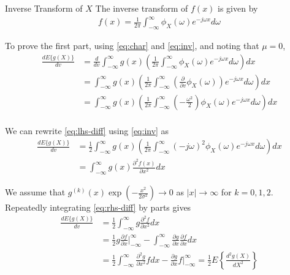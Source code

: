 \documentclass{beamer}
\begin{document}
\begin{frame}
	\begin{alertblock}{Inverse Transform of $X$}
		The inverse transform of $f(x)$ is given by
		\begin{align}
			f(x) = \frac{1}{2\pi}\int_{-\infty}^{\infty}\phi_X(\omega)e^{-j\omega x}d\omega
			\label{eq:inv}
		\end{align}
	\end{alertblock}
	To prove the first part, using \eqref{eq:char} and \eqref{eq:inv}, and noting that $\mu = 0$,
	\begin{align}
		\frac{dE\{g(X)\}}{dv} &= \frac{d}{dv}\int_{-\infty}^{\infty}g(x)\left(\frac{1}{2\pi}\int_{-\infty}^{\infty}\phi_X(\omega)e^{-j\omega x}d\omega\right)dx \\
		&= \int_{-\infty}^{\infty}g(x)\left(\frac{1}{2\pi}\int_{-\infty}^{\infty}\left(\frac{\partial}{\partial v}\phi_X(\omega)\right)e^{-j\omega x}d\omega\right)dx \\
		&= \int_{-\infty}^{\infty}g(x)\left(\frac{1}{2\pi}\int_{-\infty}^{\infty}\left(-\frac{\omega^2}{2}\right)\phi_X(\omega)e^{-j\omega x}d\omega\right)dx \\
		\label{eq:lhs-diff}
	\end{align}
\end{frame}

\begin{frame}
	We can rewrite \eqref{eq:lhs-diff} using \eqref{eq:inv} as
	\begin{align}
		\frac{dE\{g(X)\}}{dv} &= \frac{1}{2}\int_{-\infty}^{\infty}g(x)\left(\frac{1}{2\pi}\int_{-\infty}^{\infty}(-j\omega)^2\phi_X(\omega)e^{-j\omega x}d\omega\right)dx \\
		&= \int_{-\infty}^{\infty}g(x)\frac{\partial^2f(x)}{\partial x^2}dx
		\label{eq:rhs-diff}
	\end{align}

	\noindent We assume that $g^{(k)}(x)\exp{(-\frac{x^2}{2\sigma^2})} \to 0$ as $|x| \to \infty$ for $k = 0, 1, 2$. Repeatedly integrating \eqref{eq:rhs-diff} by parts gives
	\begin{align}
		\frac{dE\{g(X)\}}{dv} &= \frac{1}{2}\int_{-\infty}^{\infty}g\frac{\partial^2f}{\partial x^2}dx \\
		&= \frac{1}{2}g\frac{\partial f}{\partial x}\Big|_{-\infty}^{\infty} - \int_{-\infty}^{\infty}\frac{\partial g}{\partial x}\frac{\partial f}{\partial x}dx \\
		&= \frac{1}{2}\int_{-\infty}^{\infty}\frac{\partial^2g}{\partial x^2}fdx - \frac{\partial g}{\partial x}f\Big|_{-\infty}^{\infty} = \frac{1}{2}E\left\{\frac{d^2g(X)}{dX^2}\right\} 
		\label{eq:sol1}
	\end{align}
\end{frame}
\end{document}
